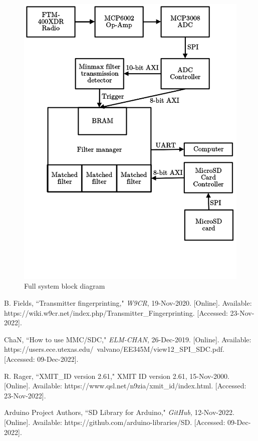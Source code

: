 \documentclass[conference]{IEEEtran}
\begin{document}
\begin{figure}
    \includegraphics[width=\textwidth]{Block_Diagram.png}
    \caption{Full system block diagram}
    \label{block_diagram}
\end{figure}

\begin{thebibliography}{00}
 B. Fields, ``Transmitter fingerprinting," \emph{W9CR}, 19-Nov-2020. [Online]. Available: https://wiki.w9cr.net/index.php/Transmitter\_Fingerprinting. [Accessed: 23-Nov-2022].

 ChaN, ``How to use MMC/SDC," \emph{ELM-CHAN}, 26-Dec-2019. [Online]. Available: https://users.ece.utexas.edu/~valvano/EE345M/view12\_SPI\_SDC.pdf. [Accessed: 09-Dec-2022].

 R. Rager, ``XMIT\_ID version 2.61," XMIT ID version 2.61, 15-Nov-2000. [Online]. Available: https://www.qsl.net/n9zia/xmit\_id/index.html. [Accessed: 23-Nov-2022].

 Arduino Project Authors, ``SD Library for Arduino," \emph{GitHub}, 12-Nov-2022. [Online]. Available: https://github.com/arduino-libraries/SD. [Accessed: 09-Dec-2022].
\end{thebibliography}

\vspace{12pt}
\end{document}
